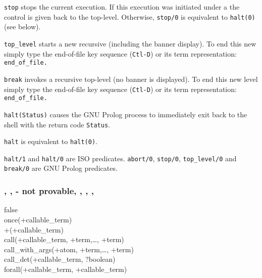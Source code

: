 \texttt{stop} stops the current execution. If this execution was initiated
under a  the control is given back to the
top-level. Otherwise, \texttt{stop/0} is equivalent to \texttt{halt(0)}
(see below).

\texttt{top\_level} starts a new recursive  (including the
banner display). To end this new  simply type the end-of-file
key sequence (\texttt{Ctl-D}) or its term representation:
\texttt{end\_of\_file.}

\texttt{break} invokes a recursive top-level (no banner is displayed). To
end this new level simply type the end-of-file key sequence (\texttt{Ctl-D})
or its term representation: \texttt{end\_of\_file.}

\texttt{halt(Status)} causes the GNU Prolog process to immediately exit back to
the shell with the return code \texttt{Status}.

\texttt{halt} is equivalent to \texttt{halt(0)}.

\begin{PlErrors}



\end{PlErrors}

\Portability

\texttt{halt/1} and \texttt{halt/0} are ISO predicates. \texttt{abort/0},
\texttt{stop/0}, \texttt{top\_level/0} and \texttt{break/0} are GNU Prolog
predicates.

\subsubsection{, ,  - not provable,
               ,
	       , , }

\begin{TemplatesOneCol}
false\\
once(+callable\_term)\\
{\bs}+(+callable\_term) \\
call(+callable\_term, +term,\ldots, +term)\\
call\_with\_args(+atom, +term,\ldots, +term)\\
call\_det(+callable\_term, ?boolean) \\
forall(+callable\_term, +callable\_term)

\end{TemplatesOneCol}

